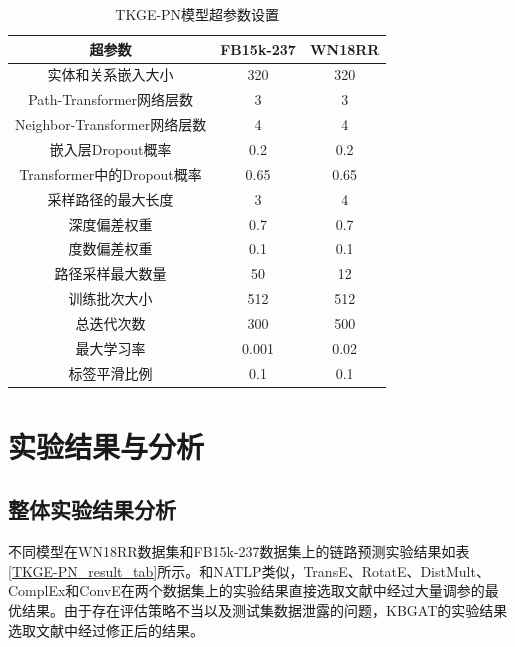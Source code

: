 \begin{table}[htbp]
    \renewcommand\arraystretch{1.5}
    \caption{TKGE-PN模型超参数设置}
    \centering
    \begin{tabular}{*{3}{c}}
      \toprule
      超参数 & FB15k-237 & WN18RR\\
      \midrule
      实体和关系嵌入大小  & 320 & 320 \\
      Path-Transformer网络层数& 3 & 3\\
      Neighbor-Transformer网络层数& 4 & 4\\
      嵌入层Dropout概率 & 0.2 & 0.2\\
      Transformer中的Dropout概率 & 0.65 & 0.65\\
      采样路径的最大长度&3 &4\\
      深度偏差权重& 0.7 & 0.7\\
      度数偏差权重& 0.1 & 0.1\\
      路径采样最大数量 &50&12\\
      训练批次大小 & 512 & 512\\
      总迭代次数& 300 & 500 \\
      最大学习率 & 0.001 & 0.02\\
      标签平滑比例 & 0.1 & 0.1\\
      \bottomrule
    \end{tabular}
    \label{TKGE-PN_hyperparameter}
  \end{table}

\section{实验结果与分析}

\subsection{整体实验结果分析}

不同模型在WN18RR数据集和FB15k-237数据集上的链路预测实验结果如表\ref{TKGE-PN_result_tab}所示。和NATLP类似，TransE、RotatE、DistMult、ComplEx和ConvE在两个数据集上的实验结果直接选取文献\cite{49}中经过大量调参的最优结果。由于存在评估策略不当以及测试集数据泄露的问题，KBGAT的实验结果选取文献\cite{50}中经过修正后的结果。

